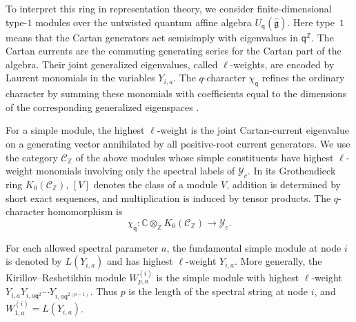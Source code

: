 \documentclass[11pt,leqno]{amsart}
\numberwithin{equation}{section}
\theoremstyle{plain}
\theoremstyle{definition}
\theoremstyle{plain}
\theoremstyle{definition}
\theoremstyle{remark}
\newcommand{\g}{\mathfrak g}
\newcommand{\qaff}{\mathsf q}
\begin{document}
To interpret this ring in representation theory, we consider finite-dimensional type-$1$ modules over the untwisted quantum affine algebra $U_{\qaff}(\widehat{\g})$.  Here type~$1$ means that the Cartan generators act semisimply with eigenvalues in $\qaff^{\mathbb Z}$.  The Cartan currents are the commuting generating series for the Cartan part of the algebra.  Their joint generalized eigenvalues, called $\ell$-weights, are encoded by Laurent monomials in the variables $Y_{i,a}$.  The $q$-character $\chi_{\qaff}$ refines the ordinary character by summing these monomials with coefficients equal to the dimensions of the corresponding generalized eigenspaces \cite{FR1998}.

For a simple module, the highest $\ell$-weight is the joint Cartan-current eigenvalue on a generating vector annihilated by all positive-root current generators.  We use the category $\mathcal C_{\mathbb Z}$ of the above modules whose simple constituents have highest $\ell$-weight monomials involving only the spectral labels of $\mathscr Y_c$.  In its Grothendieck ring $K_0(\mathcal C_{\mathbb Z})$, $[V]$ denotes the class of a module $V$, addition is determined by short exact sequences, and multiplication is induced by tensor products.  The $q$-character homomorphism is
\[
 \chi_{\qaff}:\mathbb C\otimes_{\mathbb Z}K_0(\mathcal C_{\mathbb Z})
       \longrightarrow\mathscr Y_c.
\]

For each allowed spectral parameter $a$, the fundamental simple module at node $i$ is denoted by $L(Y_{i,a})$ and has highest $\ell$-weight $Y_{i,a}$.  More generally, the Kirillov--Reshetikhin module $W^{(i)}_{p,a}$ is the simple module with highest $\ell$-weight $Y_{i,a}Y_{i,a\qaff^2}\cdots Y_{i,a\qaff^{2(p-1)}}$.  Thus $p$ is the length of the spectral string at node $i$, and $W^{(i)}_{1,a}=L(Y_{i,a})$.
\end{document}
